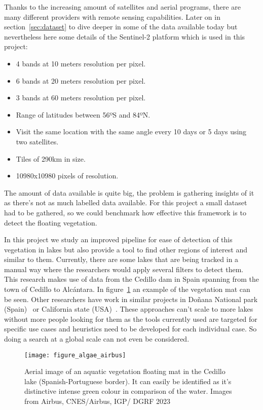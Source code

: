 \documentclass[conference]{IEEEtran}
\begin{document}
    Thanks to the increasing amount of satellites and aerial programs, there are many different providers with remote sensing capabilities.
    Later on in section~\ref{sec:dataset} to dive deeper in some of the data available today but nevertheless here some details of the Sentinel-2 platform
    which is used in this project:
    \begin{itemize}
        \item 4 bands at 10 meters resolution per pixel.
        \item 6 bands at 20 meters resolution per pixel.
        \item 3 bands at 60 meters resolution per pixel.
        \item Range of latitudes between 56ºS and 84ºN.
        \item Visit the same location with the same angle every 10 days or 5 days using two satellites.
        \item Tiles of 290km in size.
        \item 10980x10980 pixels of resolution.
    \end{itemize}
    The amount of data available is quite big, the problem is gathering insights of it as there's not as much labelled data
    available.
    For this project a small dataset had to be gathered, so we could benchmark how effective this framework is to detect the
    floating vegetation.

    In this project we study an improved pipeline for ease of detection of this vegetation in lakes but also provide a tool
    to find other regions of interest and similar to them.
    Currently, there are some lakes that are being tracked in a manual way where the researchers would apply several filters to detect them.
    This research makes use of data from the Cedillo dam in Spain spanning from the town of Cedillo to Alcántara.
    In figure~\ref{fig:satellite-image-airbus} an example of the vegetation mat can be seen.
    Other researchers have work in similar projects in Doñana National park (Spain)~\cite{donyana1, donyana2} or California state (USA)~\cite{rs14133013}.
    These approaches can't scale to more lakes without more people looking for them as the tools currently used are targeted
    for specific use cases and heuristics need to be developed for each individual case.
    So doing a search at a global scale can not even be considered.

    \begin{figure}[h]
        \centering
        \texttt{[image: figure\_algae\_airbus]}
        \caption{Aerial image of an aquatic vegetation floating mat in the Cedillo lake (Spanish-Portuguese border). It can easily be identified as it's distinctive
        intense green colour in comparison of the water. Images from Airbus, CNES/Airbus, IGP/ DGRF 2023}
        \label{fig:satellite-image-airbus}
    \end{figure}
\end{document}
